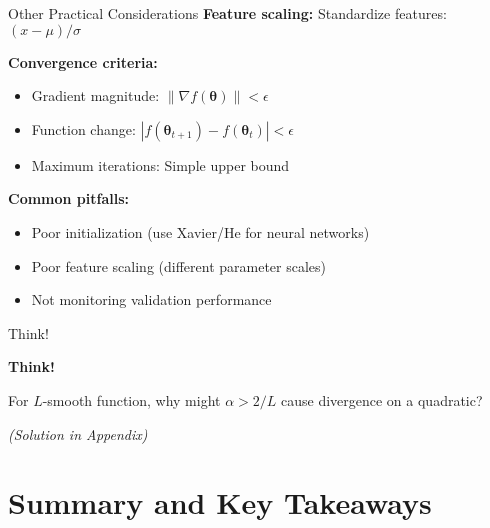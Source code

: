 \documentclass[aspectratio=169,11pt]{beamer}
\newcommand{\grad}{\nabla}
\newcommand{\vtheta}{\bm{\theta}}
\begin{document}
\begin{frame}{Other Practical Considerations}
\textbf{Feature scaling:} Standardize features: $(x - \mu)/\sigma$

\textbf{Convergence criteria:}
\begin{itemize}
\item Gradient magnitude: $\|\grad f(\vtheta)\| < \epsilon$
\item Function change: $|f(\vtheta_{t+1}) - f(\vtheta_t)| < \epsilon$
\item Maximum iterations: Simple upper bound
\end{itemize}

\pause
\textbf{Common pitfalls:}
\begin{itemize}
\item Poor initialization (use Xavier/He for neural networks)
\item Poor feature scaling (different parameter scales)
\item Not monitoring validation performance
\end{itemize}
\end{frame}

\begin{frame}{Think!}
\begin{center}
\Large \textbf{Think!}
\end{center}

For $L$-smooth function, why might $\alpha > 2/L$ cause divergence on a quadratic?

\pause
\vspace{1cm}
\textit{(Solution in Appendix)}
\end{frame}

\section{Summary and Key Takeaways}
\end{document}
